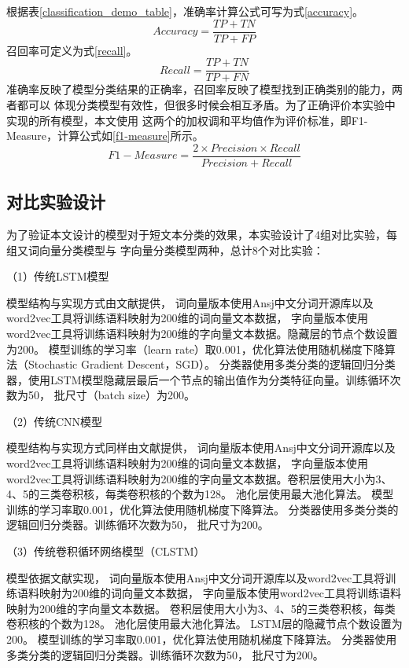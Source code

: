 根据表\ref{classification_demo_table}，准确率计算公式可写为式\ref{accuracy}。
\begin{equation}
    Accuracy=\frac{TP+TN}{TP+FP}
    \label{accuracy}
\end{equation}
召回率可定义为式\ref{recall}。
\begin{equation}
    Recall=\frac{TP+TN}{TP+FN}
    \label{recall}
\end{equation}
准确率反映了模型分类结果的正确率，召回率反映了模型找到正确类别的能力，两者都可以
体现分类模型有效性，但很多时候会相互矛盾。为了正确评价本实验中实现的所有模型，本文使用
这两个的加权调和平均值作为评价标准，即F1-Measure，计算公式如\ref{f1-measure}所示。
\begin{equation}
    F1-Measure=\frac{2\times Precision \times Recall}{Precision+Recall}
    \label{f1-measure}
\end{equation}
\subsection{对比实验设计}
为了验证本文设计的模型对于短文本分类的效果，本实验设计了4组对比实验，每组又词向量分类模型与
字向量分类模型两种，总计8个对比实验：

（1）传统LSTM模型

模型结构与实现方式由文献\cite{zhou2016compositional}提供，
词向量版本使用Ansj中文分词开源库以及word2vec工具将训练语料映射为200维的词向量文本数据，
字向量版本使用word2vec工具将训练语料映射为200维的字向量文本数据。隐藏层的节点个数设置为200。
模型训练的学习率（learn rate）取0.001，优化算法使用随机梯度下降算法（Stochastic Gradient Descent，SGD）。
分类器使用多类分类的逻辑回归分类器，使用LSTM模型隐藏层最后一个节点的输出值作为分类特征向量。训练循环次数为50，
批尺寸（batch size）为200。

（2）传统CNN模型

模型结构与实现方式同样由文献\cite{zhou2016compositional}提供，
词向量版本使用Ansj中文分词开源库以及word2vec工具将训练语料映射为200维的词向量文本数据，
字向量版本使用word2vec工具将训练语料映射为200维的字向量文本数据。卷积层使用大小为3、4、5的三类卷积核，每类卷积核的个数为128。
池化层使用最大池化算法。
模型训练的学习率取0.001，优化算法使用随机梯度下降算法。
分类器使用多类分类的逻辑回归分类器。训练循环次数为50，
批尺寸为200。

（3）传统卷积循环网络模型（CLSTM）

模型依据文献\cite{Zhou2015A}实现，
词向量版本使用Ansj中文分词开源库以及word2vec工具将训练语料映射为200维的词向量文本数据，
字向量版本使用word2vec工具将训练语料映射为200维的字向量文本数据。
卷积层使用大小为3、4、5的三类卷积核，每类卷积核的个数为128。
池化层使用最大池化算法。
LSTM层的隐藏节点个数设置为200。
模型训练的学习率取0.001，优化算法使用随机梯度下降算法。
分类器使用多类分类的逻辑回归分类器。训练循环次数为50，
批尺寸为200。

